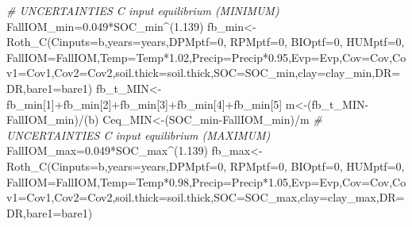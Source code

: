 \documentclass[
  10pt,
  b5paper,
]{book}
\newenvironment{Shaded}{\begin{snugshade}}{\end{snugshade}}
\newcommand{\AttributeTok}[1]{\textcolor[rgb]{0.77,0.63,0.00}{#1}}
\newcommand{\CommentTok}[1]{\textcolor[rgb]{0.56,0.35,0.01}{\textit{#1}}}
\newcommand{\DecValTok}[1]{\textcolor[rgb]{0.00,0.00,0.81}{#1}}
\newcommand{\FloatTok}[1]{\textcolor[rgb]{0.00,0.00,0.81}{#1}}
\newcommand{\FunctionTok}[1]{\textcolor[rgb]{0.00,0.00,0.00}{#1}}
\newcommand{\NormalTok}[1]{#1}
\newcommand{\OtherTok}[1]{\textcolor[rgb]{0.56,0.35,0.01}{#1}}
\newcommand{\SpecialCharTok}[1]{\textcolor[rgb]{0.00,0.00,0.00}{#1}}
\begin{document}
\begin{Shaded}
\begin{Highlighting}[]
\CommentTok{\# UNCERTAINTIES C input equilibrium (MINIMUM)}
\NormalTok{FallIOM\_min}\OtherTok{=}\FloatTok{0.049}\SpecialCharTok{*}\NormalTok{SOC\_min}\SpecialCharTok{\^{}}\NormalTok{(}\FloatTok{1.139}\NormalTok{) }
\NormalTok{fb\_min}\OtherTok{\textless{}{-}}\FunctionTok{Roth\_C}\NormalTok{(}\AttributeTok{Cinputs=}\NormalTok{b,}\AttributeTok{years=}\NormalTok{years,}\AttributeTok{DPMptf=}\DecValTok{0}\NormalTok{, }\AttributeTok{RPMptf=}\DecValTok{0}\NormalTok{, }\AttributeTok{BIOptf=}\DecValTok{0}\NormalTok{, }\AttributeTok{HUMptf=}\DecValTok{0}\NormalTok{, }\AttributeTok{FallIOM=}\NormalTok{FallIOM,}\AttributeTok{Temp=}\NormalTok{Temp}\SpecialCharTok{*}\FloatTok{1.02}\NormalTok{,}\AttributeTok{Precip=}\NormalTok{Precip}\SpecialCharTok{*}\FloatTok{0.95}\NormalTok{,}\AttributeTok{Evp=}\NormalTok{Evp,}\AttributeTok{Cov=}\NormalTok{Cov,}\AttributeTok{Cov1=}\NormalTok{Cov1,}\AttributeTok{Cov2=}\NormalTok{Cov2,}\AttributeTok{soil.thick=}\NormalTok{soil.thick,}\AttributeTok{SOC=}\NormalTok{SOC\_min,}\AttributeTok{clay=}\NormalTok{clay\_min,}\AttributeTok{DR=}\NormalTok{DR,}\AttributeTok{bare1=}\NormalTok{bare1)}
\NormalTok{fb\_t\_MIN}\OtherTok{\textless{}{-}}\NormalTok{fb\_min[}\DecValTok{1}\NormalTok{]}\SpecialCharTok{+}\NormalTok{fb\_min[}\DecValTok{2}\NormalTok{]}\SpecialCharTok{+}\NormalTok{fb\_min[}\DecValTok{3}\NormalTok{]}\SpecialCharTok{+}\NormalTok{fb\_min[}\DecValTok{4}\NormalTok{]}\SpecialCharTok{+}\NormalTok{fb\_min[}\DecValTok{5}\NormalTok{]}
\NormalTok{m}\OtherTok{\textless{}{-}}\NormalTok{(fb\_t\_MIN}\SpecialCharTok{{-}}\NormalTok{FallIOM\_min)}\SpecialCharTok{/}\NormalTok{(b)}
\NormalTok{Ceq\_MIN}\OtherTok{\textless{}{-}}\NormalTok{(SOC\_min}\SpecialCharTok{{-}}\NormalTok{FallIOM\_min)}\SpecialCharTok{/}\NormalTok{m}
\CommentTok{\# UNCERTAINTIES C input equilibrium (MAXIMUM)}
\NormalTok{FallIOM\_max}\OtherTok{=}\FloatTok{0.049}\SpecialCharTok{*}\NormalTok{SOC\_max}\SpecialCharTok{\^{}}\NormalTok{(}\FloatTok{1.139}\NormalTok{) }
\NormalTok{fb\_max}\OtherTok{\textless{}{-}}\FunctionTok{Roth\_C}\NormalTok{(}\AttributeTok{Cinputs=}\NormalTok{b,}\AttributeTok{years=}\NormalTok{years,}\AttributeTok{DPMptf=}\DecValTok{0}\NormalTok{, }\AttributeTok{RPMptf=}\DecValTok{0}\NormalTok{, }\AttributeTok{BIOptf=}\DecValTok{0}\NormalTok{, }\AttributeTok{HUMptf=}\DecValTok{0}\NormalTok{, }\AttributeTok{FallIOM=}\NormalTok{FallIOM,}\AttributeTok{Temp=}\NormalTok{Temp}\SpecialCharTok{*}\FloatTok{0.98}\NormalTok{,}\AttributeTok{Precip=}\NormalTok{Precip}\SpecialCharTok{*}\FloatTok{1.05}\NormalTok{,}\AttributeTok{Evp=}\NormalTok{Evp,}\AttributeTok{Cov=}\NormalTok{Cov,}\AttributeTok{Cov1=}\NormalTok{Cov1,}\AttributeTok{Cov2=}\NormalTok{Cov2,}\AttributeTok{soil.thick=}\NormalTok{soil.thick,}\AttributeTok{SOC=}\NormalTok{SOC\_max,}\AttributeTok{clay=}\NormalTok{clay\_max,}\AttributeTok{DR=}\NormalTok{DR,}\AttributeTok{bare1=}\NormalTok{bare1)}

\end{Highlighting}
\end{Shaded}
\end{document}
